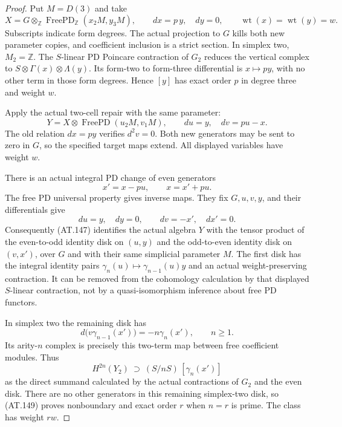 \begin{proof}
Put $M=D(3)$ and take
\[
 X=G\otimes_{\mathbb Z}
       \operatorname{FreePD}_{\mathbb Z}(x_2M,y_3M),
       \qquad dx=p\,y,\quad dy=0,
       \qquad \operatorname{wt}(x)=\operatorname{wt}(y)=w.
 \tag{AT.145}
\]
Subscripts indicate form degrees. The actual projection
to $G$ kills both new parameter copies, and coefficient
inclusion is a strict section.
In simplex two, $M_2=\mathbb Z$.
The $S$-linear PD Poincare contraction of $G_2$ reduces
the vertical complex to
$S\otimes\Gamma(x)\otimes\Lambda(y)$.
Its form-two to form-three differential is
$x\mapsto p y$, with no other term in those form
degrees. Hence $[y]$ has exact order $p$ in degree
three and weight $w$.

Apply the actual two-cell repair with the same parameter:
\[
 Y=X\otimes\operatorname{FreePD}(u_2M,v_1M),
                    \qquad du=y,\quad dv=p u-x .
 \tag{AT.146}
\]
The old relation $dx=p y$ verifies $d^2v=0$.
Both new generators may be sent to zero in $G$, so the
specified target maps extend.
All displayed variables have weight $w$.

There is an actual integral PD change of even generators
\[
                         x'=x-pu,\qquad x=x'+pu.
 \tag{AT.147}
\]
The free PD universal property gives inverse maps.
They fix $G,u,v,y$, and their differentials give
\[
                    du=y,\quad dy=0,\qquad
                    dv=-x',\quad dx'=0.
 \tag{AT.148}
\]
Consequently (AT.147) identifies the actual algebra $Y$
with the tensor product of the even-to-odd identity
disk on $(u,y)$ and the odd-to-even identity disk on
$(v,x')$, over $G$ and with their same simplicial
parameter $M$.
The first disk has the integral identity pairs
$\gamma_n(u)\mapsto\gamma_{n-1}(u)y$ and an actual
weight-preserving contraction. It can be removed from
the cohomology calculation by that displayed
$S$-linear contraction, not by a quasi-isomorphism
inference about free PD functors.

In simplex two the remaining disk has
\[
 d\bigl(v\gamma_{n-1}(x')\bigr)
                  =-n\gamma_n(x'),\qquad n\geq1.
 \tag{AT.149}
\]
Its arity-$n$ complex is precisely this two-term map
between free coefficient modules.
Thus
\[
 H^{2n}(Y_2)\ \supset\
                (S/nS)\,[\gamma_n(x')]
\]
as the direct summand calculated by the actual
contractions of $G_2$ and the even disk.
There are no other generators in this remaining
simplex-two disk, so (AT.149) proves nonboundary
and exact order $r$ when $n=r$ is prime.
The class has weight $rw$.


\end{proof}
